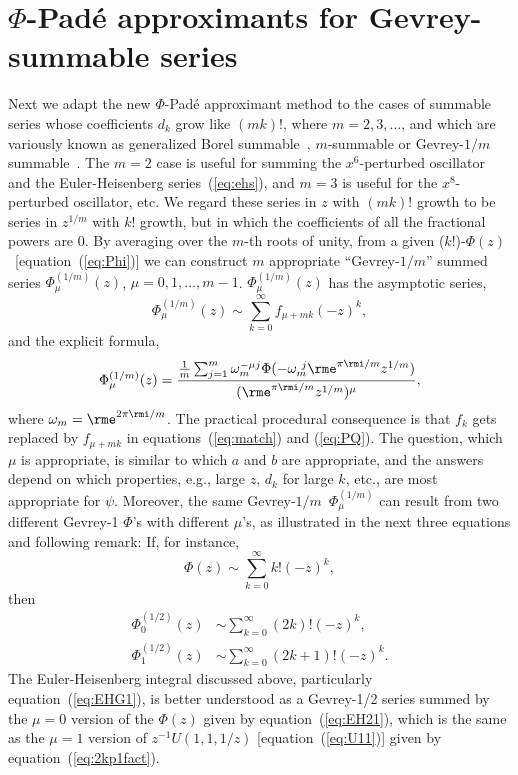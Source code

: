 \documentclass[12pt]{iopart}
\begin{document}
\section{$\Phi$-Pad\'e approximants for Gevrey-summable series}
Next we adapt the new $\Phi$-Pad\'e approximant method to the cases of summable series
whose coefficients $d_k$  grow like $(mk)!$, where $m=2,3,\ldots$, and which are 
variously known as generalized Borel summable~\cite{GR70}, $m$-summable or Gevrey-$1/m$
summable~\cite{RA93}. The $m=2$ case is useful for summing the $x^6$-perturbed oscillator and the Euler-Heisenberg series~(\ref{eq:ehs}), and
$m=3$ is useful for the $x^8$-perturbed oscillator, etc.
We regard these series in $z$ with $(mk)!$ growth to be series in $z^{1/m}$ with $k!$ growth, but in which the coefficients
of all the fractional powers are 0. By averaging over the $m$-th roots of unity, from a given ($k!$)-$\Phi(z)$~[equation~(\ref{eq:Phi})] we can construct $m$
appropriate ``Gevrey-$1/m$'' summed series $\Phi_\mu^{(1/m)}(z)$, $\mu=0, 1, \ldots,m-1$. 
$\Phi_\mu^{(1/m)}(z)$ has the asymptotic series,
%
\begin{equation}
   \Phi_\mu^{(1/m)}(z) \sim \sum_{k=0}^\infty  f_{\mu+mk}(-z)^k ,
\end{equation}
%
and the explicit formula,
%
\begin{equation}
	\label{eq:gev}
  	\Phi_\mu^{(1/m)}(z)  =
	\frac{ 
	\frac{1}{m}
	 \sum_{j=1}^m 
		\omega_m^{-\mu j}
	 \Phi(-
	 	\omega_m^{\  j}
	\rme^{\pi\rmi/m} z^{1/m} ) }
	{
	(\rme^{\pi\rmi/m} z^{1/m})^{\mu}
	 },
\end{equation}
%
where $\omega_m=\rme^{2\pi\rmi /m}$. The practical procedural consequence
is that $f_k$ gets replaced by $f_{\mu+mk}$ in equations~(\ref{eq:match}) and (\ref{eq:PQ}).
%
The question, which $\mu$ is appropriate, is similar to which $a$ and $b$ are appropriate, and the answers depend on which properties, e.g., large $z$, $d_k$ for large $k$, etc., are most appropriate for $\psi$. Moreover, the same Gevrey-$1/m$~$\Phi_\mu^{(1/m)}$ can result from two different Gevrey-1 $\Phi$'s with different $\mu$'s, as illustrated in the next three equations and following remark:
%
If, for instance, 
%
\begin{equation}
   \Phi(z) \sim \sum_{k=0}^\infty k!(-z)^k ,
\label{eq:U11}
\end{equation}
%
then
%
\begin{eqnarray}
   \Phi_0^{(1/2)}(z) & \sim \sum_{k=0}^\infty (2k)!(-z)^k ,
\\
   \Phi_1^{(1/2)}(z) & \sim \sum_{k=0}^\infty (2k+1)!(-z)^k .
\label{eq:2kp1fact}
\end{eqnarray}
%
%
The Euler-Heisenberg integral discussed above, particularly equation~(\ref{eq:EHG1}), is better understood as a Gevrey-1/2 series summed by the $\mu=0$ version of the $\Phi(z)$ given by equation~(\ref{eq:EH21}), which is the same as the $\mu=1$ version of $z^{-1}U(1,1,1/z)$ [equation~(\ref{eq:U11})] given by equation~(\ref{eq:2kp1fact}).
\end{document}
